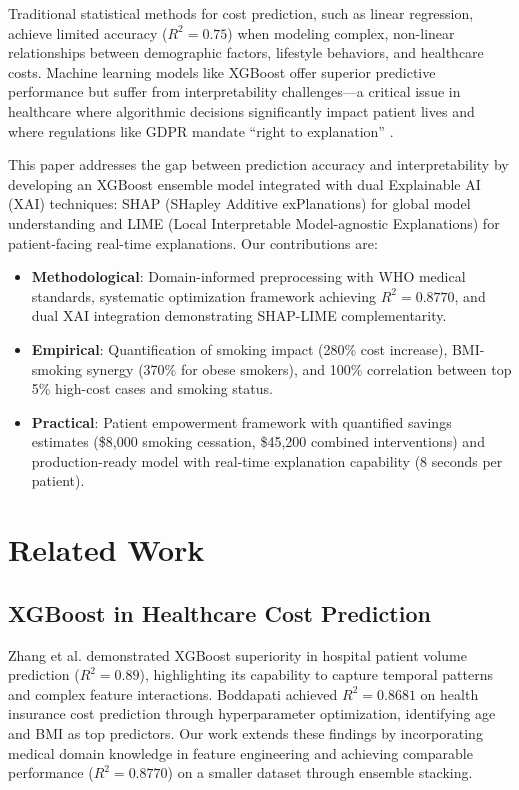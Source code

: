 \documentclass[conference]{IEEEtran}
\begin{document}
Traditional statistical methods for cost prediction, such as linear regression, achieve limited accuracy ($R^2 = 0.75$) \cite{susilo2024} when modeling complex, non-linear relationships between demographic factors, lifestyle behaviors, and healthcare costs. Machine learning models like XGBoost offer superior predictive performance but suffer from interpretability challenges---a critical issue in healthcare where algorithmic decisions significantly impact patient lives and where regulations like GDPR mandate ``right to explanation'' \cite{lundberg2017}.

This paper addresses the gap between prediction accuracy and interpretability by developing an XGBoost ensemble model integrated with dual Explainable AI (XAI) techniques: SHAP (SHapley Additive exPlanations) for global model understanding and LIME (Local Interpretable Model-agnostic Explanations) for patient-facing real-time explanations. Our contributions are:

\begin{itemize}
\item \textbf{Methodological}: Domain-informed preprocessing with WHO medical standards, systematic optimization framework achieving $R^2 = 0.8770$, and dual XAI integration demonstrating SHAP-LIME complementarity.

\item \textbf{Empirical}: Quantification of smoking impact (280\% cost increase), BMI-smoking synergy (370\% for obese smokers), and 100\% correlation between top 5\% high-cost cases and smoking status.

\item \textbf{Practical}: Patient empowerment framework with quantified savings estimates (\$8,000 smoking cessation, \$45,200 combined interventions) and production-ready model with real-time explanation capability (8 seconds per patient).
\end{itemize}

\section{Related Work}

\subsection{XGBoost in Healthcare Cost Prediction}
Zhang et al. \cite{zhang2025} demonstrated XGBoost superiority in hospital patient volume prediction ($R^2 = 0.89$), highlighting its capability to capture temporal patterns and complex feature interactions. Boddapati \cite{boddapati2023} achieved $R^2 = 0.8681$ on health insurance cost prediction through hyperparameter optimization, identifying age and BMI as top predictors. Our work extends these findings by incorporating medical domain knowledge in feature engineering and achieving comparable performance ($R^2 = 0.8770$) on a smaller dataset through ensemble stacking.
\end{document}
